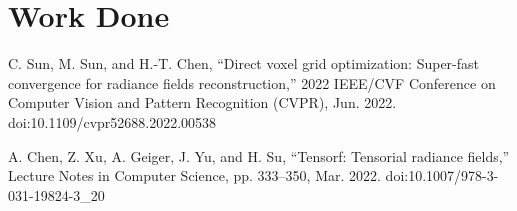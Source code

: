 \documentclass[conference]{IEEEtran}
\begin{document}
\section{Work Done}


\begin{thebibliography}{00}

 C. Sun, M. Sun, and H.-T. Chen, “Direct voxel grid optimization: Super-fast convergence for radiance fields reconstruction,” 2022 IEEE/CVF Conference on Computer Vision and Pattern Recognition (CVPR), Jun. 2022. doi:10.1109/cvpr52688.2022.00538

 A. Chen, Z. Xu, A. Geiger, J. Yu, and H. Su, “Tensorf: Tensorial radiance fields,” Lecture Notes in Computer Science, pp. 333–350, Mar. 2022. doi:10.1007/978-3-031-19824-3_20

\end{thebibliography}
\end{document}
